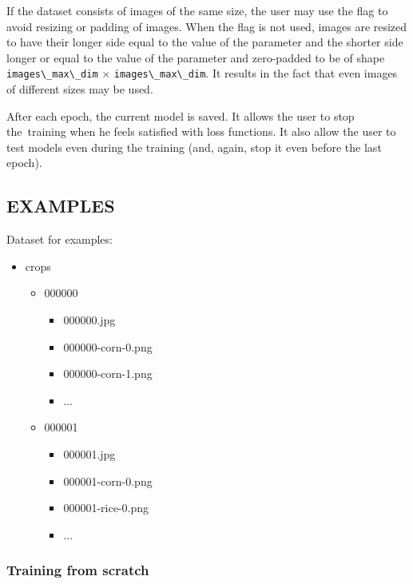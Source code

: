 If the dataset consists of images of the same size, the user may use the
 flag to avoid resizing or padding of images. When the
flag is not used, images are resized to have their longer side equal to the
value of the  parameter and the shorter
side longer or equal to the value of the 
parameter and zero-padded to be of shape \verb|images\_max\_dim| $\times$
\verb|images\_max\_dim|. It results in the fact that even images of different
sizes may be used. 

After each epoch, the current model is saved. It allows the user to stop the~training
when he feels satisfied with loss functions. It also allow the user to
test models even during the training (and, again, stop it even before the last
epoch). 

\subsection*{EXAMPLES}
Dataset for examples: 

\liststyleLii
\begin{itemize}
\item crops 

\begin{itemize}
\item 000000 

\begin{itemize}
\item 000000.jpg 
\item 000000-corn-0.png 
\item 000000-corn-1.png 
\item ... 
\end{itemize}
\item 000001 

\begin{itemize}
\item 000001.jpg 
\item 000001-corn-0.png 
\item 000001-rice-0.png 
\item ... 
\end{itemize}
\end{itemize}
\end{itemize}

\subsubsection*{Training from scratch}

